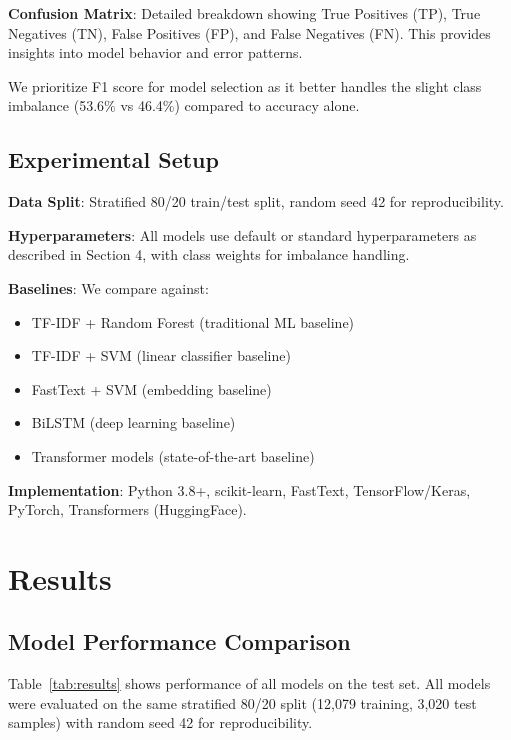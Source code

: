 \documentclass[11pt]{article}
\begin{document}
\textbf{Confusion Matrix}: Detailed breakdown showing True Positives (TP), True Negatives (TN), False Positives (FP), and False Negatives (FN). This provides insights into model behavior and error patterns.

We prioritize F1 score for model selection as it better handles the slight class imbalance (53.6\% vs 46.4\%) compared to accuracy alone.

\subsection{Experimental Setup}

\textbf{Data Split}: Stratified 80/20 train/test split, random seed 42 for reproducibility.

\textbf{Hyperparameters}: All models use default or standard hyperparameters as described in Section 4, with class weights for imbalance handling.

\textbf{Baselines}: We compare against:
\begin{itemize}
\item TF-IDF + Random Forest (traditional ML baseline)
\item TF-IDF + SVM (linear classifier baseline)
\item FastText + SVM (embedding baseline)
\item BiLSTM (deep learning baseline)
\item Transformer models (state-of-the-art baseline)
\end{itemize}

\textbf{Implementation}: Python 3.8+, scikit-learn, FastText, TensorFlow/Keras, PyTorch, Transformers (HuggingFace).

\section{Results}

\subsection{Model Performance Comparison}

Table~\ref{tab:results} shows performance of all models on the test set. All models were evaluated on the same stratified 80/20 split (12,079 training, 3,020 test samples) with random seed 42 for reproducibility.
\end{document}
